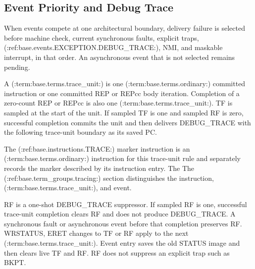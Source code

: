 \subsection{Event Priority and Debug Trace}\label{section:event-priority-and-debug-trace}
When events compete at one architectural boundary, delivery failure is selected before machine check, current
synchronous faults, explicit traps, (:ref:base.events.EXCEPTION.DEBUG_TRACE:), NMI, and maskable interrupt, in that order. An
asynchronous event that is not selected remains pending.

A (:term:base.terms.trace_unit:) is one (:term:base.terms.ordinary:) committed instruction or one committed REP or REPcc body iteration. Completion of a
zero-count REP or REPcc is also one (:term:base.terms.trace_unit:). TF is sampled at the start of
the unit. If sampled TF is one and sampled RF is zero, successful completion commits the unit and then
delivers DEBUG\_TRACE with the following trace-unit boundary as its saved PC.

The (:ref:base.instructions.TRACE:) marker instruction is an (:term:base.terms.ordinary:) instruction for this trace-unit rule
and separately records the marker described by its instruction entry. The
The (:ref:base.term_groups.tracing:) section distinguishes the instruction, (:term:base.terms.trace_unit:), and event.

RF is a one-shot DEBUG\_TRACE suppressor. If sampled RF is one, successful trace-unit completion clears RF and does
not produce DEBUG\_TRACE. A synchronous fault or asynchronous event before that completion preserves RF. WRSTATUS,
ERET changes to TF or RF apply to the next (:term:base.terms.trace_unit:). Event entry saves the old STATUS image and then
clears live TF and RF. RF does not suppress an explicit trap such as BKPT.
